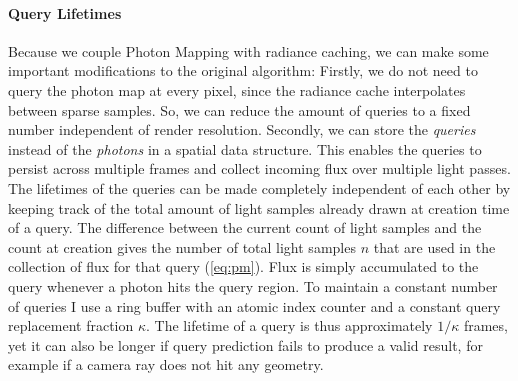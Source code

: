 \paragraph{Query Lifetimes}
Because we couple Photon Mapping with radiance caching, we can make some important modifications to the original algorithm:
Firstly, we do not need to query the photon map at every pixel, since the radiance cache interpolates between sparse samples.
So, we can reduce the amount of queries to a fixed number independent of render resolution.
Secondly, we can store the \emph{queries} instead of the \emph{photons} in a spatial data structure.
This enables the queries to persist across multiple frames and collect incoming flux over multiple light passes.
The lifetimes of the queries can be made completely independent of each other by keeping track of the total amount of light samples already drawn at creation time of a query.
The difference between the current count of light samples and the count at creation gives the number of total light samples $n$ that are used in the collection of flux for that query (\cref{eq:pm}).
Flux is simply accumulated to the query whenever a photon hits the query region.
To maintain a constant number of queries I use a ring buffer with an atomic index counter and a constant query replacement fraction $\kappa$.
The lifetime of a query is thus approximately $1/\kappa$ frames, yet it can also be longer if query prediction fails to produce a valid result, for example if a camera ray does not hit any geometry.

